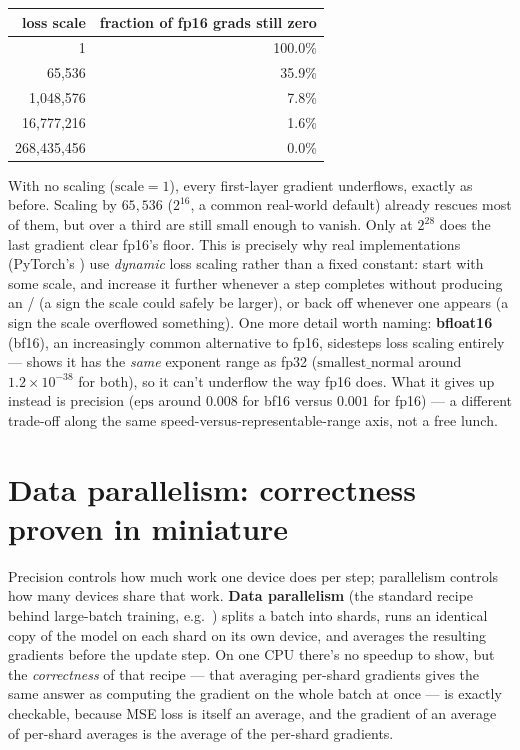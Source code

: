 \begin{center}
\renewcommand{\arraystretch}{1.3}
\begin{tabular}{rr}
\hline
\textbf{loss scale} & \textbf{fraction of fp16 grads still zero} \\
\hline
1           & 100.0\% \\
65{,}536    & 35.9\% \\
1{,}048{,}576   & 7.8\% \\
16{,}777{,}216  & 1.6\% \\
268{,}435{,}456 & 0.0\% \\
\hline
\end{tabular}
\end{center}

With no scaling ($\text{scale}=1$), every first-layer gradient underflows, exactly as before. Scaling by $65{,}536$ ($2^{16}$, a common real-world default) already rescues most of them, but over a third are still small enough to vanish. Only at $2^{28}$ does the last gradient clear fp16's floor. This is precisely why real implementations (PyTorch's ) use \emph{dynamic} loss scaling rather than a fixed constant: start with some scale, and increase it further whenever a step completes without producing an / (a sign the scale could safely be larger), or back off whenever one appears (a sign the scale overflowed something). One more detail worth naming: \textbf{bfloat16} (bf16), an increasingly common alternative to fp16, sidesteps loss scaling entirely ---  shows it has the \emph{same} exponent range as fp32 ($\text{smallest\_normal}$ around $1.2\times10^{-38}$ for both), so it can't underflow the way fp16 does. What it gives up instead is precision ($\text{eps}$ around $0.008$ for bf16 versus $0.001$ for fp16) --- a different trade-off along the same speed-versus-representable-range axis, not a free lunch.

\section{Data parallelism: correctness proven in miniature}

Precision controls how much work one device does per step; parallelism controls how many devices share that work. \textbf{Data parallelism} (the standard recipe behind large-batch training, e.g.\ ) splits a batch into shards, runs an identical copy of the model on each shard on its own device, and averages the resulting gradients before the update step. On one CPU there's no speedup to show, but the \emph{correctness} of that recipe --- that averaging per-shard gradients gives the same answer as computing the gradient on the whole batch at once --- is exactly checkable, because MSE loss is itself an average, and the gradient of an average of per-shard averages is the average of the per-shard gradients.

